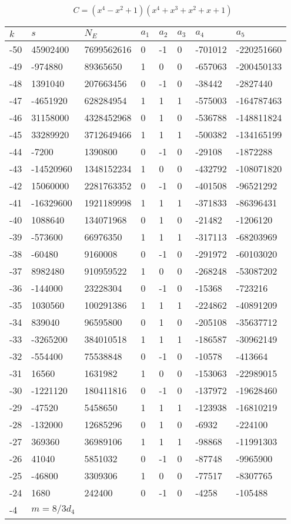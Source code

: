\documentclass{amsart}
\begin{document}
$$C=(x^4
 - x^2
 + 1)(x^4
 + x^3
 + x^2
 + x
 + 1)$$
\begin{longtable}{|l|l|l|lllll|}
\hline
$k$ & $s$ & $N_E$ & $a_1$ & $a_2$ & $a_3$ & $a_4$ & $a_5$\\
\hline
-50&45902400&7699562616&0&-1&0&-701012&-220251660\\
-49&-974880&89365650&1&0&0&-657063&-200450133\\
-48&1391040&207663456&0&-1&0&-38442&-2827440\\
-47&-4651920&628284954&1&1&1&-575003&-164787463\\
-46&31158000&4328452968&0&1&0&-536788&-148811824\\
-45&33289920&3712649466&1&1&1&-500382&-134165199\\
-44&-7200&1390800&0&-1&0&-29108&-1872288\\
-43&-14520960&1348152234&1&0&0&-432792&-108071820\\
-42&15060000&2281763352&0&-1&0&-401508&-96521292\\
-41&-16329600&1921189998&1&1&1&-371833&-86396431\\
-40&1088640&134071968&0&1&0&-21482&-1206120\\
-39&-573600&66976350&1&1&1&-317113&-68203969\\
-38&-60480&9160008&0&-1&0&-291972&-60103020\\
-37&8982480&910959522&1&0&0&-268248&-53087202\\
-36&-144000&23228304&0&-1&0&-15368&-723216\\
-35&1030560&100291386&1&1&1&-224862&-40891209\\
-34&839040&96595800&0&1&0&-205108&-35637712\\
-33&-3265200&384010518&1&1&1&-186587&-30962149\\
-32&-554400&75538848&0&-1&0&-10578&-413664\\
-31&16560&1631982&1&0&0&-153063&-22989015\\
-30&-1221120&180411816&0&-1&0&-137972&-19628460\\
-29&-47520&5458650&1&1&1&-123938&-16810219\\
-28&-132000&12685296&0&1&0&-6932&-224100\\
-27&369360&36989106&1&1&1&-98868&-11991303\\
-26&41040&5851032&0&-1&0&-87748&-9965900\\
-25&-46800&3309306&1&0&0&-77517&-8307765\\
-24&1680&242400&0&-1&0&-4258&-105488\\
-4&$m=8/3d_{4}$&&\multicolumn{5}{c|}{}\\
\hline
\end{longtable}
\end{document}
